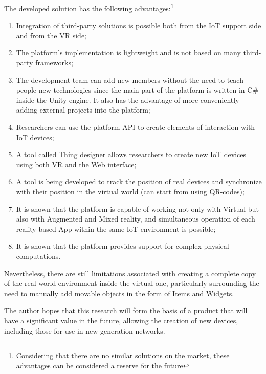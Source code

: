 The developed solution has the following advantages:\footnote{Considering that there are no similar solutions on the market, these advantages can be considered a reserve for the future}
\begin{enumerate}
    \item Integration of third-party solutions is possible both from the IoT support side and from the VR side;
    \item The platform's implementation is lightweight and is not based on many third-party frameworks;
    \item The development team can add new members without the need to teach people new technologies since the main part of the platform is written in C\# inside the Unity engine. It also has the advantage of more conveniently adding external projects into the platform;
    \item Researchers can use the platform API to create elements of interaction with IoT devices;
    \item A tool called Thing designer allows researchers to create new IoT devices using both VR and the Web interface;
    \item A tool is being developed to track the position of real devices and synchronize with their position in the virtual world (can start from using QR-codes);
    \item It is shown that the platform is capable of working not only with Virtual but also with Augmented and Mixed reality, and simultaneous operation of each reality-based App within the same IoT environment is possible;
    \item It is shown that the platform provides support for complex physical computations.
\end{enumerate}

Nevertheless, there are still limitations associated with creating a complete copy of the real-world environment inside the virtual one, particularly surrounding the need to manually add movable objects in the form of Items and Widgets.

The author hopes that this research will form the basis of a product that will have a significant value in the future, allowing the creation of new devices, including those for use in new generation networks.
